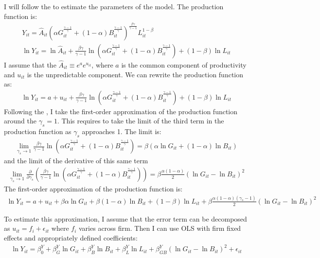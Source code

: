 I will follow the \cite{kmenta1967estimation} to estimate the parameters of the model. The production function is:
\begin{gather*}
    Y_{it} = \hat{A}_{it}(
        \alpha G_{it}^{\frac{\gamma-1}{\gamma}} + (1-\alpha) B_{it}^{\frac{\gamma-1}{\gamma}}
    ) ^ {\frac{\beta\gamma}{\gamma-1}} L_{it}^{1-\beta}\\
    \ln Y_{it} = \ln \hat{A}_{it} + \frac{\beta\gamma}{\gamma-1} \ln(
        \alpha G_{it}^{\frac{\gamma-1}{\gamma}} + (1-\alpha) B_{it}^{\frac{\gamma-1}{\gamma}}
    ) + (1-\beta) \ln L_{it}
\end{gather*}
I assume that the $\hat{A}_{it} \equiv e^a e^{u_{it}}$, where $a$ is the common component of productivity and $u_{it}$ is the unpredictable component. We can rewrite the production function as:
\begin{gather*}
    \ln Y_{it} = a + u_{it} + \frac{\beta\gamma}{\gamma-1} \ln(
        \alpha G_{it}^{\frac{\gamma-1}{\gamma}} + (1-\alpha) B_{it}^{\frac{\gamma-1}{\gamma}}
    ) + (1-\beta) \ln L_{it}
\end{gather*}
Following the \cite{kmenta1967estimation}, I take the first-order approximation of the production function around the $\gamma_s = 1$. This requires to take the limit of the third term in the production function as $\gamma_s$ approaches 1. The limit is:
\begin{gather*}
    \lim_{\gamma_s \to 1} \frac{\beta\gamma}{\gamma-1} \ln(
        \alpha G_{it}^{\frac{\gamma-1}{\gamma}} + (1-\alpha) B_{it}^{\frac{\gamma-1}{\gamma}}
    ) = \beta (\alpha \ln G_{it}   + (1-\alpha)\ln B_{it} )
\end{gather*}
and the limit of the derivative of this same term
\begin{gather*}
    \lim_{\gamma_s \to 1} \frac{\partial}{\partial \gamma_s} \left( \frac{\beta\gamma}{\gamma-1} \ln(
        \alpha G_{it}^{\frac{\gamma-1}{\gamma}} + (1-\alpha) B_{it}^{\frac{\gamma-1}{\gamma}}
    ) \right) = \beta \frac{\alpha (1-\alpha)}{2}(\ln G_{it} - \ln B_{it})^2
\end{gather*}
The first-order approximation of the production function is:
\begin{gather*}
    \ln Y_{it} = a + u_{it} +  \beta\alpha \ln G_{it}   + \beta(1-\alpha)\ln B_{it} + (1-\beta) \ln L_{it} + \beta \frac{\alpha (1-\alpha)(\gamma_s - 1)}{2}(\ln G_{it} - \ln B_{it})^2
\end{gather*}

To estimate this approximation, I assume that the error term can be decomposed as $u_{it} = f_i + \epsilon_{it}$ where $f_i$ varies across firm. Then I can use OLS with firm fixed effects and appropriately defined coefficients:
\begin{gather*}
    \ln Y_{it} = \beta_0^Y + \beta_G^Y \ln G_{it} + \beta_B^Y \ln B_{it} + \beta_L^Y \ln L_{it} + \beta_{GB}^Y (\ln G_{it} - \ln B_{it})^2 + \epsilon_{it}
\end{gather*}


